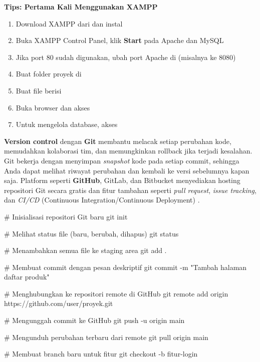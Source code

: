 \begin{catatan}
\textbf{Tips: Pertama Kali Menggunakan XAMPP}

\begin{enumerate}
  \item Download XAMPP dari  dan instal
  \item Buka XAMPP Control Panel, klik \textbf{Start} pada Apache dan MySQL
  \item Jika port 80 sudah digunakan, ubah port Apache di  (misalnya ke 8080)
  \item Buat folder proyek di 
  \item Buat file  berisi 
  \item Buka browser dan akses 
  \item Untuk mengelola database, akses 
\end{enumerate}
\end{catatan}

\textbf{Version control} dengan \textbf{Git} membantu melacak setiap perubahan kode, memudahkan kolaborasi tim, dan memungkinkan rollback jika terjadi kesalahan. Git bekerja dengan menyimpan \textit{snapshot} kode pada setiap commit, sehingga Anda dapat melihat riwayat perubahan dan kembali ke versi sebelumnya kapan saja. Platform seperti \textbf{GitHub}, GitLab, dan Bitbucket menyediakan hosting repositori Git secara gratis dan fitur tambahan seperti \textit{pull request}, \textit{issue tracking}, dan \textit{CI/CD} (Continuous Integration/Continuous Deployment) \cite{mdnLearn}.

\begin{webcode}[language=Bash, caption={Perintah dasar Git untuk proyek web}]
# Inisialisasi repositori Git baru
git init

# Melihat status file (baru, berubah, dihapus)
git status

# Menambahkan semua file ke staging area
git add .

# Membuat commit dengan pesan deskriptif
git commit -m "Tambah halaman daftar produk"

# Menghubungkan ke repositori remote di GitHub
git remote add origin https://github.com/user/proyek.git

# Mengunggah commit ke GitHub
git push -u origin main

# Mengunduh perubahan terbaru dari remote
git pull origin main

# Membuat branch baru untuk fitur
git checkout -b fitur-login
\end{webcode}


